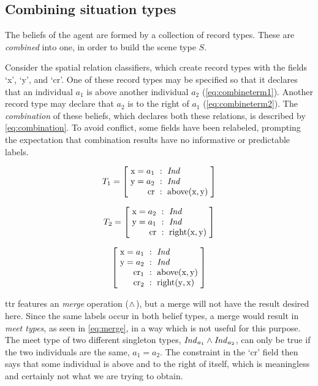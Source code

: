 \subsection{Combining situation types}
\label{sec:combine}

The beliefs of the agent are formed by a collection of record types.
These are \textit{combined} into one, in order to build the scene type $S$.

Consider the spatial relation classifiers, which create record types with the fields `x', `y', and `cr'.
One of these record types may be specified so that it declares that an individual $a_1$ is above another individual $a_2$ (\autoref{eq:combineterm1}).
Another record type may declare that $a_2$ is to the right of $a_1$ (\autoref{eq:combineterm2}).
The \textit{combination} of these beliefs, which declares both these relations, is described by \autoref{eq:combination}.
To avoid conflict, some fields have been relabeled, prompting the expectation that combination results have no informative or predictable labels.

\begin{equation} \label{eq:combineterm1}
T_1 = \rec{
    \text{x}=a_1 &:& \type{Ind} \\
    \text{y}=a_2 &:& \type{Ind} \\
    \text{cr} &:& \text{above}(\text{x}, \text{y})
    }
\end{equation}

\begin{equation} \label{eq:combineterm2}
T_2 = \rec{
    \text{x}=a_2 &:& \type{Ind} \\
    \text{y}=a_1 &:& \type{Ind} \\
    \text{cr} &:& \text{right}(\text{x}, \text{y})
    }
\end{equation}

\begin{equation} \label{eq:combination}
\rec{
    \text{x}=a_1 &:& \type{Ind} \\
    \text{y}=a_2 &:& \type{Ind} \\
    \text{cr}_1 &:& \text{above}(\text{x}, \text{y}) \\
    \text{cr}_2 &:& \text{right}(\text{y}, \text{x})
    }
\end{equation}

\gls{ttr} features an \textit{merge} operation ($\mathrel{\wedge_{\mkern-10mu\cdot\mkern6mu}}$), but a merge will not have the result desired here.
Since the same labels occur in both belief types, a merge would result in \textit{meet types}, as seen in \autoref{eq:merge}, in a way which is not useful for this purpose.
The meet type of two different singleton types, $\mathit{Ind}_{a_1} \wedge \mathit{Ind}_{a_2}$, can only be true if the two individuals are the same, $a_1 = a_2$.
The constraint in the `cr' field then says that some individual is above and to the right of itself, which is meaningless and certainly not what we are trying to obtain.

